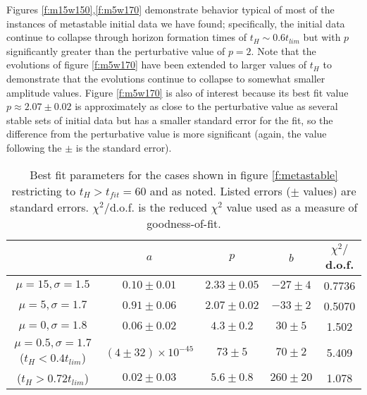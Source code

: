 \documentclass[../PhD.tex]{subfiles}
\begin{document}
Figures \ref{f:m15w150},\ref{f:m5w170} demonstrate behavior typical of most
of the instances of metastable initial data we have found; specifically,
the initial data continue to collapse through horizon formation times of
$t_H\sim 0.6 t_{lim}$ but with $p$ significantly greater than the perturbative
value of $p=2$. Note that the evolutions of figure \ref{f:m5w170} have
been extended to larger
values of $t_H$ to demonstrate that the evolutions continue to collapse to
somewhat smaller amplitude values.  Figure \ref{f:m5w170} is also of
interest because its best fit value $p\approx 2.07\pm 0.02$ 
is approximately as close
to the perturbative value as several stable sets of initial data but has a
smaller standard error for the fit, so the difference from the perturbative
value is more significant (again, the value following the $\pm$ is the 
standard error).

\begin{table}[!t]
\begin{center}
\begin{tabular}{|c|c|c|c|c|}
\hline
&$a$&$p$ &$b$ & $\chi^2/$d.o.f.\\
\hline
$\mu=15,\sigma=1.5$& $0.10\pm 0.01$&$2.33\pm 0.05$& $-27\pm 4$&0.7736\\
\hline
$\mu=5,\sigma=1.7$&$0.91\pm 0.06$ & $2.07\pm 0.02$& $-33\pm 2$&0.5070\\
\hline
$\mu=0,\sigma=1.8$&$0.06\pm 0.02$&$4.3\pm 0.2$& $30\pm 5$& 1.502\\
\hline
$\mu=0.5,\sigma=1.7$ ($t_H<0.4t_{lim}$)&$(4\pm 32)\times 10^{-45}$ &$73\pm 5$ 
&$70\pm 2$ &5.409 \\
($t_H>0.72t_{lim}$)& $0.02\pm 0.03$ & $5.6\pm 0.8$ & $260\pm 20$ &1.078 \\
\hline
\end{tabular}
\end{center}
\caption[Best fit parameters for metastable data]{Best fit parameters for the cases shown in figure \ref{f:metastable}
restricting to $t_H>t_{fit}=60$ and as noted.  Listed errors ($\pm$ values) are
standard errors. $\chi^2/$d.o.f. is the
reduced $\chi^2$ value used as a measure of goodness-of-fit. }
\label{t:figfits}
\end{table}
\end{document}
